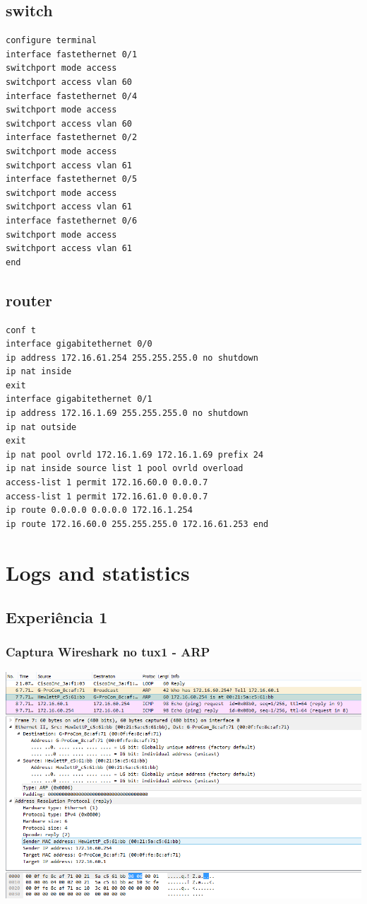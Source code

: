 \documentclass[11pt,a4paper,reqno]{report}
\numberwithin{equation}{section}
\begin{document}
\begin{appendices}
\section{switch}
\begin{verbatim}
configure terminal
interface fastethernet 0/1
switchport mode access
switchport access vlan 60
interface fastethernet 0/4
switchport mode access
switchport access vlan 60
interface fastethernet 0/2
switchport mode access
switchport access vlan 61
interface fastethernet 0/5
switchport mode access
switchport access vlan 61
interface fastethernet 0/6
switchport mode access
switchport access vlan 61
end
\end{verbatim}
\section{router}
\begin{verbatim}
conf t
interface gigabitethernet 0/0
ip address 172.16.61.254 255.255.255.0 no shutdown
ip nat inside
exit
interface gigabitethernet 0/1
ip address 172.16.1.69 255.255.255.0 no shutdown
ip nat outside
exit
ip nat pool ovrld 172.16.1.69 172.16.1.69 prefix 24 
ip nat inside source list 1 pool ovrld overload
access-list 1 permit 172.16.60.0 0.0.0.7 
access-list 1 permit 172.16.61.0 0.0.0.7
ip route 0.0.0.0 0.0.0.0 172.16.1.254
ip route 172.16.60.0 255.255.255.0 172.16.61.253 end
\end{verbatim}

\chapter{Logs and statistics}%

\section{Experiência 1}%
\label{ex1_headers}
\subsection{Captura Wireshark no tux1 - ARP}
\includegraphics[width=16cm]{ex1_arp.png}

\end{appendices}
\end{document}
